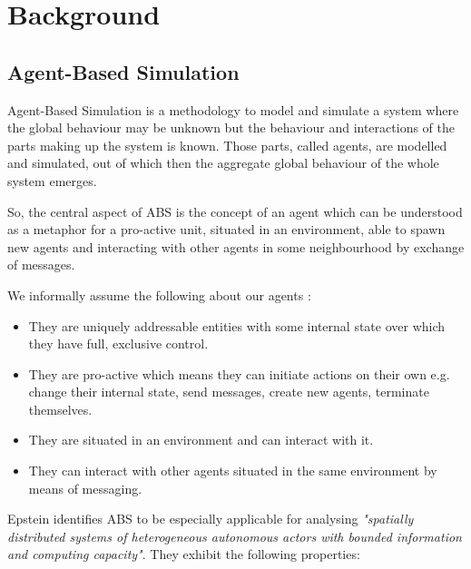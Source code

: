\section{Background}
\label{sec:background}

\subsection{Agent-Based Simulation}
Agent-Based Simulation is a methodology to model and simulate a system where the global behaviour may be unknown but the behaviour and interactions of the parts making up the system is known. Those parts, called agents, are modelled and simulated, out of which then the aggregate global behaviour of the whole system emerges.

So, the central aspect of ABS is the concept of an agent which can be understood as a metaphor for a pro-active unit, situated in an environment, able to spawn new agents and interacting with other agents in some neighbourhood by exchange of messages. 

We informally assume the following about our agents \cite{siebers_introduction_2008, wooldridge_introduction_2009, macal_everything_2016}:

\begin{itemize}
	\item They are uniquely addressable entities with some internal state over which they have full, exclusive control.
	\item They are pro-active which means they can initiate actions on their own e.g. change their internal state, send messages, create new agents, terminate themselves.
	\item They are situated in an environment and can interact with it.
	\item They can interact with other agents situated in the same environment by means of messaging.
\end{itemize} 

Epstein \cite{epstein_generative_2012} identifies ABS to be especially applicable for analysing \textit{"spatially distributed systems of heterogeneous autonomous actors with bounded information and computing capacity"}. %
They exhibit the following properties:

